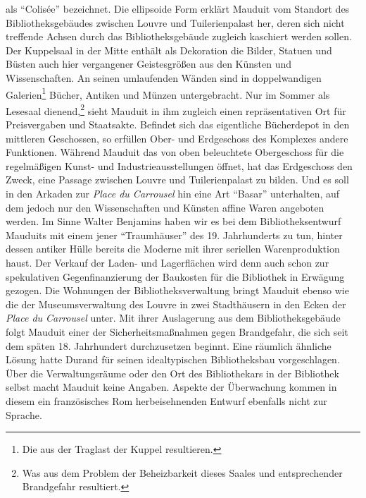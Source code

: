 als \enquote{Colisée} bezeichnet. Die ellipsoide Form erklärt Mauduit
vom Standort des Bibliotheksgebäudes zwischen Louvre und Tuilerienpalast
her, deren sich nicht treffende Achsen durch das Bibliotheksgebäude
zugleich kaschiert werden sollen. Der Kuppelsaal in der Mitte enthält
als Dekoration die Bilder, Statuen und Büsten auch hier vergangener
Geistesgrößen aus den Künsten und Wissenschaften. An seinen umlaufenden
Wänden sind in doppelwandigen Galerien\footnote{Die aus der Traglast der
  Kuppel resultieren.} Bücher, Antiken und Münzen untergebracht. Nur im
Sommer als Lesesaal dienend,\footnote{Was aus dem Problem der
  Beheizbarkeit dieses Saales und entsprechender Brandgefahr resultiert.}
sieht Mauduit in ihm zugleich einen repräsentativen Ort für
Preisvergaben und Staatsakte. Befindet sich das eigentliche Bücherdepot
in den mittleren Geschossen, so erfüllen Ober- und Erdgeschoss des
Komplexes andere Funktionen. Während Mauduit das von oben beleuchtete
Obergeschoss für die regelmäßigen Kunst- und Industrieausstellungen
öffnet, hat das Erdgeschoss den Zweck, eine Passage zwischen Louvre und
Tuilerienpalast zu bilden. Und es soll in den Arkaden zur \emph{Place du
Carrousel} hin eine Art \enquote{Basar} unterhalten, auf dem jedoch nur
den Wissenschaften und Künsten affine Waren angeboten werden. Im Sinne
Walter Benjamins haben wir es bei dem Bibliotheksentwurf Mauduits mit
einem jener \enquote{Traumhäuser} des 19. Jahrhunderts zu tun, hinter
dessen antiker Hülle bereits die Moderne mit ihrer seriellen
Warenproduktion haust. Der Verkauf der Laden- und Lagerflächen wird denn
auch schon zur spekulativen Gegenfinanzierung der Baukosten für die
Bibliothek in Erwägung gezogen. Die Wohnungen der Bibliotheksverwaltung
bringt Mauduit ebenso wie die der Museumsverwaltung des Louvre in zwei
Stadthäusern in den Ecken der \emph{Place du Carrousel} unter. Mit ihrer
Auslagerung aus dem Bibliotheksgebäude folgt Mauduit einer der
Sicherheitsmaßnahmen gegen Brandgefahr, die sich seit dem späten 18.
Jahrhundert durchzusetzen beginnt. Eine räumlich ähnliche Lösung hatte
Durand für seinen idealtypischen Bibliotheksbau vorgeschlagen. Über die
Verwaltungsräume oder den Ort des Bibliothekars in der Bibliothek selbst
macht Mauduit keine Angaben. Aspekte der Überwachung kommen in diesem
ein französisches Rom herbeisehnenden Entwurf ebenfalls nicht zur
Sprache.

